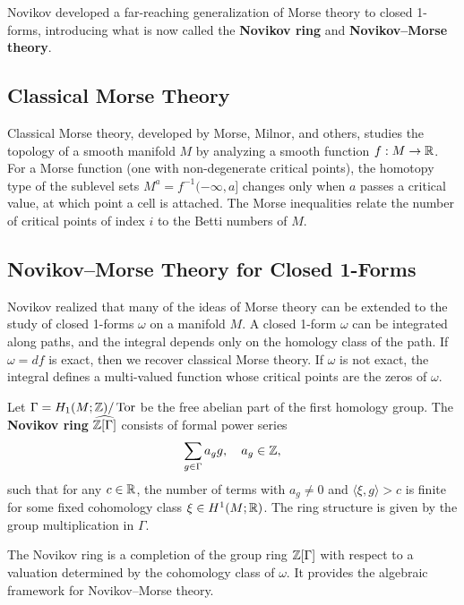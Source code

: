 Novikov developed a far-reaching generalization of Morse theory to closed 1-forms, introducing what is now called the \textbf{Novikov ring} and \textbf{Novikov--Morse theory}.

\subsection{Classical Morse Theory}

Classical Morse theory, developed by Morse, Milnor, and others, studies the topology of a smooth manifold \(M\) by analyzing a smooth function \(f: M \to \mathbb{R}\). For a Morse function (one with non-degenerate critical points), the homotopy type of the sublevel sets \(M^a = f^{-1}(-\infty, a]\) changes only when \(a\) passes a critical value, at which point a cell is attached. The Morse inequalities relate the number of critical points of index \(i\) to the Betti numbers of \(M\).

\subsection{Novikov--Morse Theory for Closed 1-Forms}

Novikov realized that many of the ideas of Morse theory can be extended to the study of closed 1-forms \(\omega\) on a manifold \(M\). A closed 1-form \(\omega\) can be integrated along paths, and the integral depends only on the homology class of the path. If \(\omega = df\) is exact, then we recover classical Morse theory. If \(\omega\) is not exact, the integral defines a multi-valued function whose critical points are the zeros of \(\omega\).

\begin{definition}
Let \(\Gamma = H_1(M; \mathbb{Z}) / \operatorname{Tor}\) be the free abelian part of the first homology group. The \textbf{Novikov ring} \(\widehat{\mathbb{Z}[\Gamma]}\) consists of formal power series
\[
\sum_{g \in \Gamma} a_g g, \quad a_g \in \mathbb{Z},
\]
such that for any \(c \in \mathbb{R}\), the number of terms with \(a_g \neq 0\) and \(\langle \xi, g \rangle > c\) is finite for some fixed cohomology class \(\xi \in H^1(M; \mathbb{R})\). The ring structure is given by the group multiplication in \(\Gamma\).
\end{definition}

The Novikov ring is a completion of the group ring \(\mathbb{Z}[\Gamma]\) with respect to a valuation determined by the cohomology class of \(\omega\). It provides the algebraic framework for Novikov--Morse theory.

